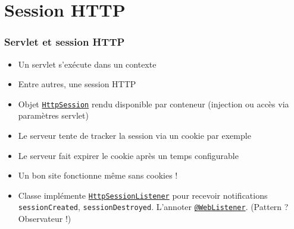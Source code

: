 \documentclass[english, french]{beamer}
\begin{document}
\section{Session HTTP}
\begin{frame}
	\frametitle{Servlet et session HTTP}
	\begin{itemize}
		\item Un servlet s’exécute dans un contexte
		\item Entre autres, une session HTTP
		\item Objet \href{https://docs.oracle.com/javaee/7/api/javax/servlet/http/HttpSession.html}{\texttt{HttpSession}} rendu disponible par conteneur ({\tiny injection ou } accès via paramètres servlet)
		\item Le serveur tente de tracker la session via un cookie {\tiny par exemple}
		\item Le serveur fait expirer le cookie après un temps configurable
		\item Un bon site fonctionne même sans cookies !
		\item Classe implémente \href{https://docs.oracle.com/javaee/7/api/javax/servlet/http/HttpSessionListener.html}{\texttt{HttpSessionListener}} pour recevoir notifications \texttt{sessionCreated}, \texttt{sessionDestroyed}.  L’annoter \href{https://docs.oracle.com/javaee/7/api/javax/servlet/annotation/WebListener.html}{\texttt{@WebListener}}. (Pattern ? \pause Observateur !)
	\end{itemize}
\end{frame}

\end{document}
